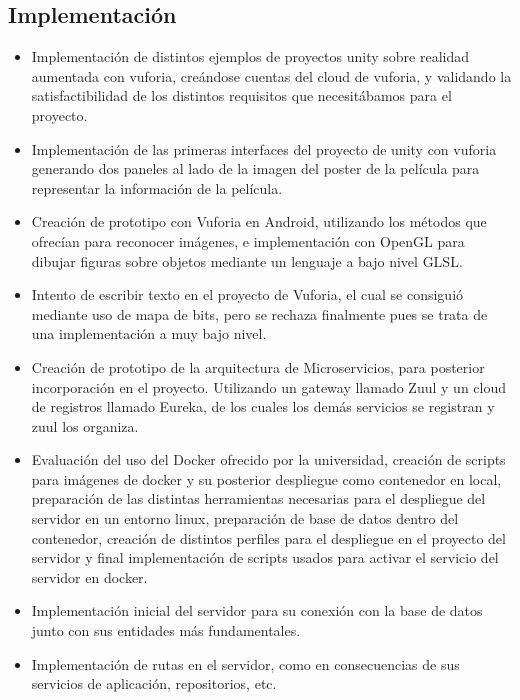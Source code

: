     \subsection{Implementación}
    \label{makereference7.4.3}
        \begin{itemize}
            \item Implementación de distintos ejemplos de proyectos unity sobre realidad aumentada
            con vuforia, creándose cuentas del cloud de vuforia, y validando la satisfactibilidad de los distintos requisitos
            que necesitábamos para el proyecto. 
            \item Implementación de las primeras interfaces del proyecto de unity con vuforia generando dos 
            paneles al lado de la imagen del poster de la película para representar la información de la película.
            \item Creación de prototipo con Vuforia en Android, utilizando los métodos que ofrecían para reconocer imágenes,
            e implementación con OpenGL para dibujar figuras sobre objetos mediante un lenguaje a bajo nivel GLSL.
            \item Intento de escribir texto en el proyecto de Vuforia, el cual se consiguió mediante uso de mapa de bits, pero se rechaza 
            finalmente pues se trata de una implementación a muy bajo nivel.
            \item Creación de prototipo de la arquitectura de Microservicios, para posterior 
            incorporación en el proyecto. Utilizando un gateway llamado Zuul y un cloud de registros llamado Eureka, de los cuales 
            los demás servicios se registran y zuul los organiza.
            \item Evaluación del uso del Docker ofrecido por la universidad, creación de 
            scripts para imágenes de docker y su posterior despliegue como contenedor en local, preparación de las distintas herramientas 
            necesarias para el despliegue del servidor en un entorno linux, preparación de base de datos dentro del contenedor, creación 
            de distintos perfiles para el despliegue en el proyecto del servidor y final implementación de scripts usados para activar el servicio 
            del servidor en docker.
            \item Implementación inicial del servidor para su conexión con la base de datos junto con sus entidades más fundamentales.
            \item Implementación de rutas en el servidor, como en consecuencias de sus servicios de aplicación, repositorios, etc.

\end{itemize}
